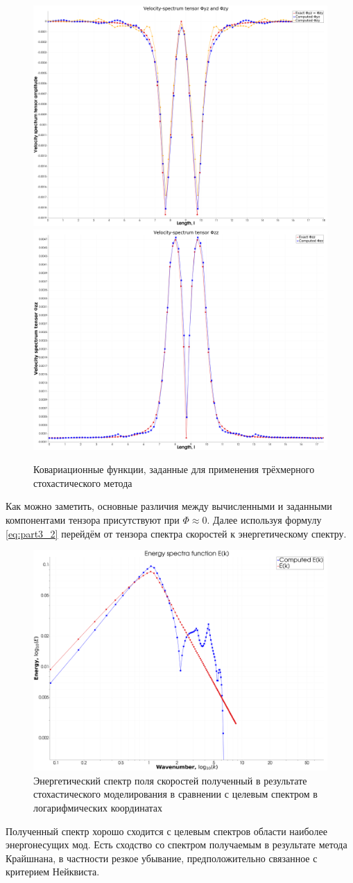 \begin{figure}[!h]
{        \hfill
        {\includegraphics[width=0.34\linewidth]{images/kriging/3components/phi_23_32_diagonal.png}}
        \hfill
        {\includegraphics[width=0.34\linewidth]{images/kriging/3components/phi_33_diagonal.png}}
        \hfill
    }
    
    \caption{Ковариационные функции, заданные для применения трёхмерного стохастического метода}
    \label{img:exact_covariance_comparison_heat_maps}  
\end{figure}

Как можно заметить, основные различия между вычисленными и заданными компонентами тензора присутствуют при $\Phi \approx 0$. Далее используя формулу \eqref{eq:part3_2} перейдём от тензора спектра скоростей к энергетическому спектру. 

\begin{figure}[ht] 
  \center
  \includegraphics [width=0.9\linewidth] {images/kriging/3components/energy_function_kriging_loglog.png}
  \caption{Энергетический спектр поля скоростей полученный в результате стохастического моделирования в сравнении с целевым спектром в логарифмических координатах} 
  \label{img:kriging_spectra_function_compare}  
\end{figure}

Полученный спектр хорошо сходится с целевым спектров области наиболее энергонесущих мод. Есть сходство со спектром получаемым в результате метода Крайшнана, в частности резкое убывание, предположительно связанное с критерием Нейквиста.
